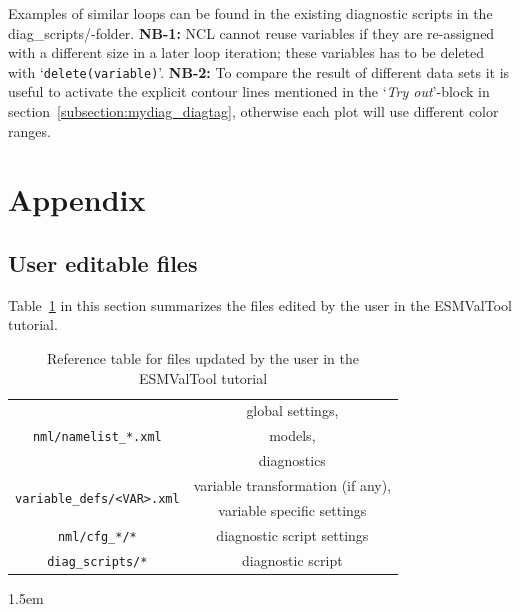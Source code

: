 \documentclass[12pt]{article}
\begin{document}
Examples of similar loops can be found in the existing diagnostic
scripts in the diag\_scripts/-folder. \textbf{NB-1:} NCL cannot reuse
variables if they are re-assigned with a different size in a later
loop iteration; these variables has to be deleted with
`\texttt{delete(variable)}'. \textbf{NB-2:} To compare the result of
different data sets it is useful to activate the explicit contour
lines mentioned in the `\emph{Try out}'-block in
section~\ref{subsection:mydiag_diagtag}, otherwise each plot will use
different color ranges.



\pagebreak
\appendix
{}
\section{Appendix}
% 
% 
\subsection{User editable files}\label{subsection:editable-files}
Table~\ref{table:editable-files} in this section summarizes the files
edited by the user in the ESMValTool tutorial. 
\begin{table}[!ht]
\begin{center}
\begin{tabular}{|c|c|}
\hline
\multirow{3}{*}{\texttt{nml/namelist\_*.xml}}      & global settings,\\
                                                   & models,\\
                                                   & diagnostics\\
\hline
\multirow{2}{*}{\texttt{variable\_defs/<VAR>.xml}} & variable transformation (if any),\\
                                                   & variable specific settings\\
\hline
\texttt{nml/cfg\_*/*}                               &  diagnostic script settings\\
\hline
\texttt{diag\_scripts/*}                           &  diagnostic script\\
\hline
\end{tabular}
\caption{Reference table for files updated by the user in the
ESMValTool tutorial}\label{table:editable-files}
\end{center}
\end{table}


\pagebreak


% 
% 

\begingroup
\raggedright
\emergencystretch 1.5em

\endgroup
\end{document}
